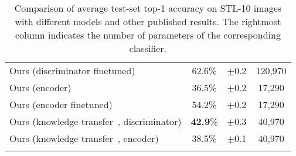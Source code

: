\documentclass[a4paper,12pt]{report}
\begin{document}
\begin{table}[ht!]
\begin{tabular}{l c c|c}
Ours (discriminator finetuned) & 62.6\%  & $\pm$0.2 & 120,970 \\ %
Ours (encoder) & 36.5\%  & $\pm$0.2 & 17,290 \\ %
Ours (encoder finetuned) & 54.2\% & $\pm$0.2 & 17,290 \\ %
\hline
Ours (knowledge transfer~\cite{KnowledgeTransfer}, discriminator) & \textbf{42.9}\% & $\pm$0.3 & 40,970 \\ %
Ours (knowledge transfer~\cite{KnowledgeTransfer}, encoder) & 38.5\% & $\pm$0.1 & 40,970 \\ %
\Xhline{0.8pt}
\end{tabular}
\caption[Comparison of average test-set top-1 accuracy on STL-10.]{Comparison of average test-set top-1 accuracy on STL-10 images with different models and other published results. The rightmost column indicates the number of parameters of the corresponding classifier.} \label{tab:comparison_stL10}
\end{table}
\end{document}

